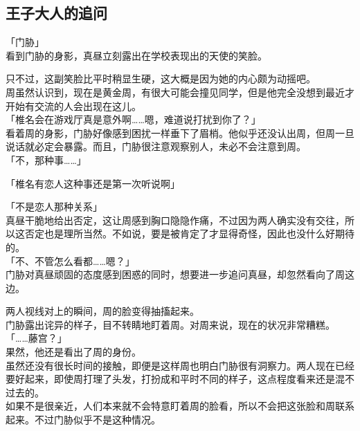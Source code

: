 \subsection{王子大人的追问}

「门胁」\\

看到门胁的身影，真昼立刻露出在学校表现出的天使的笑脸。

只不过，这副笑脸比平时稍显生硬，这大概是因为她的内心颇为动摇吧。\\

周虽然认识到，现在是黄金周，有很大可能会撞见同学，但是他完全没想到最近才开始有交流的人会出现在这儿。\\

「椎名会在游戏厅真是意外啊……嗯，难道说打扰到你了？」\\

看着周的身影，门胁好像感到困扰一样垂下了眉梢。他似乎还没认出周，但周一旦说话就必定会暴露。而且，门胁很注意观察别人，未必不会注意到周。\\

「不，那种事……」

「椎名有恋人这种事还是第一次听说啊」

「不是恋人那种关系」\\

真昼干脆地给出否定，这让周感到胸口隐隐作痛，不过因为两人确实没有交往，所以这否定也是理所当然。不如说，要是被肯定了才显得奇怪，因此也没什么好期待的。\\

「不、不管怎么看都……嗯？」\\

门胁对真昼顽固的态度感到困惑的同时，想要进一步追问真昼，却忽然看向了周这边。

两人视线对上的瞬间，周的脸变得抽搐起来。\\

门胁露出诧异的样子，目不转睛地盯着周。对周来说，现在的状况非常糟糕。\\

「……藤宫？」\\

果然，他还是看出了周的身份。\\

虽然还没有很长时间的接触，即便是这样周也明白门胁很有洞察力。两人现在已经要好起来，即使周打理了头发，打扮成和平时不同的样子，这点程度看来还是混不过去的。\\

如果不是很亲近，人们本来就不会特意盯着周的脸看，所以不会把这张脸和周联系起来。不过门胁似乎不是这种情况。\\

